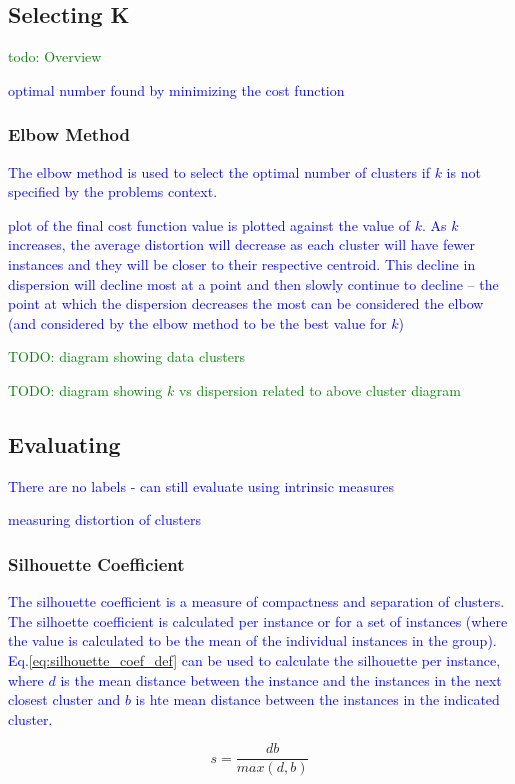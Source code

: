 \subsection{Selecting K}

\textcolor{green}{todo: Overview}

\textcolor{blue}{optimal number found by minimizing the cost function}

\subsubsection{Elbow Method}

\textcolor{blue}{The elbow method is used to select the optimal number of clusters if $k$ is not specified by the problems context.}

\textcolor{blue}{plot of the final cost function value is plotted against the value of $k$. As $k$ increases, the average distortion will decrease as each cluster will have fewer instances and they will be closer to their respective centroid. This decline in dispersion will decline most at a point and then slowly continue to decline -- the point at which the dispersion decreases the most can be considered the elbow (and considered by the elbow method to be the best value for $k$)}

\textcolor{green}{TODO: diagram showing data clusters}

\textcolor{green}{TODO: diagram showing $k$ vs dispersion related to above cluster diagram}

\subsection{Evaluating}

\textcolor{blue}{There are no labels - can still evaluate using intrinsic measures}

\textcolor{blue}{measuring distortion of clusters}

\subsubsection{Silhouette Coefficient}

\textcolor{blue}{The {silhouette coefficient} is a measure of compactness and separation of clusters. The silhoette coefficient is calculated per instance or for a set of instances (where the value is calculated to be the mean of the individual instances in the group). Eq.\ref{eq:silhouette_coef_def} can be used to calculate the silhouette per instance, where $d$ is the mean distance between the instance and the instances in the next closest cluster and $b$ is hte mean distance between the instances in the indicated cluster.}

\begin{equation}
{s = \frac{db}{max(d,b)}}
\label{eq:silhouette_coef_def}
\end{equation}





